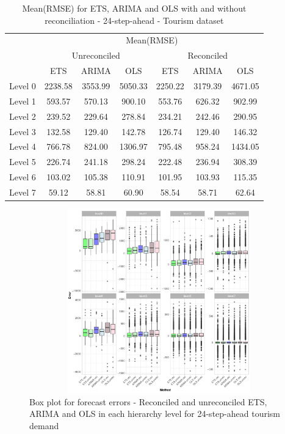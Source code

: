 \documentclass[11pt,a4paper,]{article}
\begin{document}
\begin{table}[t]

\caption{\label{tab:TourismdataresultRMSE}Mean(RMSE) for ETS, ARIMA and OLS with and without reconciliation - 24-step-ahead - Tourism dataset}
\centering
\begin{tabular}{ccccccc}
\toprule
\multicolumn{1}{c}{} & \multicolumn{6}{c}{Mean(RMSE)} \\
\cmidrule(l{3pt}r{3pt}){2-7}
\multicolumn{1}{c}{} & \multicolumn{3}{c}{Unreconciled} & \multicolumn{3}{c}{Reconciled} \\
\cmidrule(l{3pt}r{3pt}){2-4} \cmidrule(l{3pt}r{3pt}){5-7}
 & ETS & ARIMA & OLS & ETS & ARIMA & OLS\\
\midrule
Level 0 & 2238.58 & 3553.99 & 5050.33 & 2250.22 & 3179.39 & 4671.05\\
Level 1 & 593.57 & 570.13 & 900.10 & 553.76 & 626.32 & 902.99\\
Level 2 & 239.52 & 229.64 & 278.84 & 234.21 & 242.46 & 290.95\\
Level 3 & 132.58 & 129.40 & 142.78 & 126.74 & 129.40 & 146.32\\
Level 4 & 766.78 & 824.00 & 1306.97 & 795.48 & 958.24 & 1434.05\\
Level 5 & 226.74 & 241.18 & 298.24 & 222.48 & 236.94 & 308.39\\
Level 6 & 103.02 & 105.38 & 110.91 & 101.95 & 103.93 & 115.35\\
Level 7 & 59.12 & 58.81 & 60.90 & 58.54 & 58.71 & 62.64\\
\bottomrule
\end{tabular}
\end{table}

\begin{figure}

{\centering \includegraphics[width=450px,height=300px]{Paper-Figures/results_Tourism/boxplot_24} 

}

\caption{Box plot for forecast errors - Reconciled and unreconciled ETS, ARIMA and OLS in each hierarchy level for 24-step-ahead tourism demand}\label{fig:boxplottourism}
\end{figure}
\end{document}
